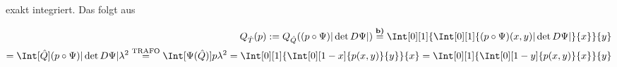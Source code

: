 \begin{solution}
\begin{enumerate}[label = \textbf{\alph*)}]
  exakt integriert. Das folgt aus

  \begin{align*}
  Q_{\hat{T}}(p)
  :=
  Q_{\hat{Q}}((p\circ \Psi) |\det D\Psi|)
  \stackrel{\textbf{b)}}{=}
  \Int[0][1]{
      \Int[0][1]{(p \circ \Psi)(x,y) |\det D\Psi|}{x}
            }{y} \\
  =
  \Int[\hat{Q}]{(p \circ \Psi)|\det D\Psi|}{\lambda^2}
  \stackrel{\mathrm{TRAFO}}{=}
  \Int[\Psi(\hat{Q})]{p}{\lambda^2}
  =
  \Int[0][1]{
      \Int[0][1-x]{p(x,y)}{y}
            }{x}
  =
  \Int[0][1]{
      \Int[0][1-y]{p(x,y)}{x}
            }{y}
  \end{align*}
\end{enumerate}

\end{solution}

